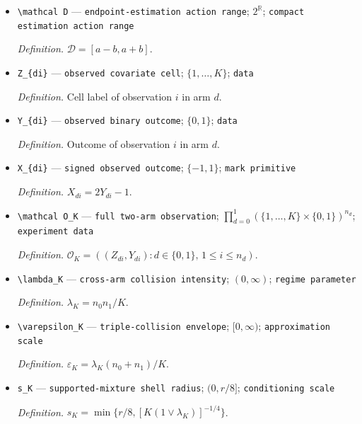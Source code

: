 \documentclass{article}
\begin{document}
\begin{itemize}
  \par\smallskip\noindent\emph{Definition.} \(\mathcal A=[a-br,a+br]\).
  \item \texttt{\textbackslash{}\allowbreak{}mathcal D} --- \texttt{endpoint-\allowbreak{}estimation action range}; \(2^{\mathbb R}\); \texttt{compact estimation action range}
  \par\smallskip\noindent\emph{Definition.} \(\mathcal D=[a-b,a+b]\).
  \item \texttt{Z\_\allowbreak{}\{di\}\allowbreak{}} --- \texttt{observed covariate cell}; \(\{1,\ldots,K\}\); \texttt{data}
  \par\smallskip\noindent\emph{Definition.} Cell label of observation \(i\) in arm \(d\).
  \item \texttt{Y\_\allowbreak{}\{di\}\allowbreak{}} --- \texttt{observed binary outcome}; \(\{0,1\}\); \texttt{data}
  \par\smallskip\noindent\emph{Definition.} Outcome of observation \(i\) in arm \(d\).
  \item \texttt{X\_\allowbreak{}\{di\}\allowbreak{}} --- \texttt{signed observed outcome}; \(\{-1,1\}\); \texttt{mark primitive}
  \par\smallskip\noindent\emph{Definition.} \(X_{di}=2Y_{di}-1\).
  \item \texttt{\textbackslash{}\allowbreak{}mathcal O\_\allowbreak{}K} --- \texttt{full two-\allowbreak{}arm observation}; \(\prod_{d=0}^{1}(\{1,\ldots,K\}\times\{0,1\})^{n_d}\); \texttt{experiment data}
  \par\smallskip\noindent\emph{Definition.} \(\mathcal O_K=((Z_{di},Y_{di}):d\in\{0,1\},\,1\le i\le n_d)\).
  \item \texttt{\textbackslash{}\allowbreak{}lambda\_\allowbreak{}K} --- \texttt{cross-\allowbreak{}arm collision intensity}; \((0,\infty)\); \texttt{regime parameter}
  \par\smallskip\noindent\emph{Definition.} \(\lambda_K=n_0n_1/K\).
  \item \texttt{\textbackslash{}\allowbreak{}varepsilon\_\allowbreak{}K} --- \texttt{triple-\allowbreak{}collision envelope}; \([0,\infty)\); \texttt{approximation scale}
  \par\smallskip\noindent\emph{Definition.} \(\varepsilon_K=\lambda_K(n_0+n_1)/K\).
  \item \texttt{s\_\allowbreak{}K} --- \texttt{supported-\allowbreak{}mixture shell radius}; \((0,r/8]\); \texttt{conditioning scale}
  \par\smallskip\noindent\emph{Definition.} \(s_K=\min\{r/8,[K(1\vee\lambda_K)]^{-1/4}\}\).

\end{itemize}
\end{document}

